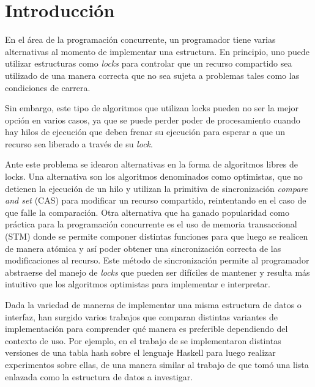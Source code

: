 \chapter{Introducción}

En el área de la programación concurrente, un programador tiene varias alternativas al momento de implementar una estructura. En principio, uno puede utilizar estructuras como \emph{locks} para controlar que un recurso compartido sea utilizado de una manera correcta que no sea sujeta a problemas tales como las condiciones de carrera.

Sin embargo, este tipo de algoritmos que utilizan locks pueden no ser la mejor opción en varios casos, ya que se puede perder poder de procesamiento cuando hay hilos de ejecución que deben frenar su ejecución para esperar a que un recurso sea liberado a través de su \emph{lock}.

Ante este problema se idearon alternativas en la forma de algoritmos libres de locks. Una alternativa son los algoritmos denominados como optimistas, que no detienen la ejecución de un hilo y utilizan la primitiva de sincronización \emph{compare and set} (CAS) para modificar un recurso compartido, reintentando en el caso de que falle la comparación. Otra alternativa que ha ganado popularidad como práctica para la programación concurrente es el uso de memoria transaccional (STM) donde se permite componer distintas funciones para que luego se realicen de manera atómica y así poder obtener una sincronización correcta de las modificaciones al recurso.
Este método de sincronización permite al programador abstraerse del manejo de \emph{locks} que pueden ser difíciles de mantener y resulta más intuitivo que los algoritmos optimistas para implementar e interpretar.

Dada la variedad de maneras de implementar una misma estructura de datos o interfaz, han surgido varios trabajos que  comparan distintas variantes de implementación para comprender qué manera es preferible dependiendo del contexto de uso. Por ejemplo, en el trabajo de \cite{hash} se implementaron distintas versiones de una tabla hash sobre el lenguaje Haskell para luego realizar experimentos sobre ellas, de una manera similar al trabajo de \cite{linked-list} que tomó una lista enlazada como la estructura de datos a investigar.

